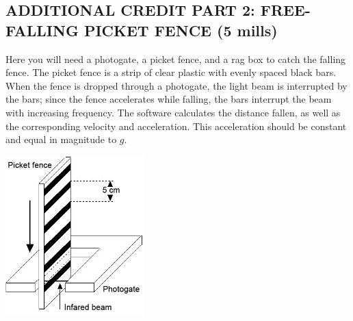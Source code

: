 \subsection*{ADDITIONAL CREDIT PART 2: FREE-FALLING PICKET FENCE (5 mills)}

Here you will need a photogate, a picket fence, and a rag box to catch the falling fence.  The picket fence is a strip of clear plastic with evenly spaced black bars.  When the fence is dropped through a photogate, the light beam is interrupted by the bars; since the fence accelerates while falling, the bars interrupt the beam with increasing frequency.  The software calculates the distance fallen, as well as the corresponding velocity and acceleration.  This acceleration should be constant and equal in magnitude to \(g\).

\begin{center} \includegraphics*[width=0.4\textwidth]{imgs/6labs/6Alab/6Aexp3/exp_fig7_fx.jpg} \end{center}

